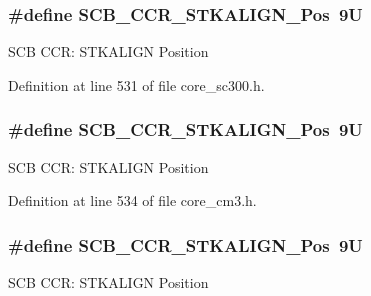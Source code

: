 \subsubsection[{\texorpdfstring{S\+C\+B\+\_\+\+C\+C\+R\+\_\+\+S\+T\+K\+A\+L\+I\+G\+N\+\_\+\+Pos}{SCB_CCR_STKALIGN_Pos}}]{\setlength{\rightskip}{0pt plus 5cm}\#define S\+C\+B\+\_\+\+C\+C\+R\+\_\+\+S\+T\+K\+A\+L\+I\+G\+N\+\_\+\+Pos~9U}\hypertarget{group___c_m_s_i_s___s_c_b_gac2d20a250960a432cc74da59d20e2f86}{}\label{group___c_m_s_i_s___s_c_b_gac2d20a250960a432cc74da59d20e2f86}
S\+CB C\+CR\+: S\+T\+K\+A\+L\+I\+GN Position 

Definition at line 531 of file core\+\_\+sc300.\+h.

\subsubsection[{\texorpdfstring{S\+C\+B\+\_\+\+C\+C\+R\+\_\+\+S\+T\+K\+A\+L\+I\+G\+N\+\_\+\+Pos}{SCB_CCR_STKALIGN_Pos}}]{\setlength{\rightskip}{0pt plus 5cm}\#define S\+C\+B\+\_\+\+C\+C\+R\+\_\+\+S\+T\+K\+A\+L\+I\+G\+N\+\_\+\+Pos~9U}\hypertarget{group___c_m_s_i_s___s_c_b_gac2d20a250960a432cc74da59d20e2f86}{}\label{group___c_m_s_i_s___s_c_b_gac2d20a250960a432cc74da59d20e2f86}
S\+CB C\+CR\+: S\+T\+K\+A\+L\+I\+GN Position 

Definition at line 534 of file core\+\_\+cm3.\+h.

\subsubsection[{\texorpdfstring{S\+C\+B\+\_\+\+C\+C\+R\+\_\+\+S\+T\+K\+A\+L\+I\+G\+N\+\_\+\+Pos}{SCB_CCR_STKALIGN_Pos}}]{\setlength{\rightskip}{0pt plus 5cm}\#define S\+C\+B\+\_\+\+C\+C\+R\+\_\+\+S\+T\+K\+A\+L\+I\+G\+N\+\_\+\+Pos~9U}\hypertarget{group___c_m_s_i_s___s_c_b_gac2d20a250960a432cc74da59d20e2f86}{}\label{group___c_m_s_i_s___s_c_b_gac2d20a250960a432cc74da59d20e2f86}
S\+CB C\+CR\+: S\+T\+K\+A\+L\+I\+GN Position 

